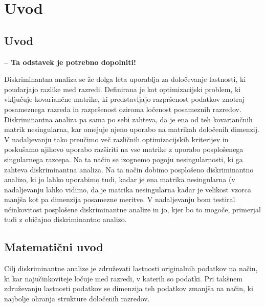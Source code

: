 \documentclass[mat1]{article}
\begin{document}
\section{Uvod}

\subsection{Uvod}

\textbf{-- Ta odstavek je potrebno dopolniti!}

Diskriminantna analiza se že dolga leta uporablja za določevanje lastnosti, ki poudarjajo razlike med razredi. Definirana je kot optimizacijski problem, ki vključuje kovariančne matrike, ki predstavljajo razpršenost podatkov znotraj posameznega razreda in razpršenost oziroma ločenost posameznih razredov. Diskriminantna analiza pa sama po sebi zahteva, da je ena od teh kovariančnih matrik nesingularna, kar omejuje njeno uporabo na matrikah določenih dimenzij. V nadaljevanju tako preučimo več različnih optimizacijskih kriterijev in poskušamo njihovo uporabo razširiti na vse matrike z uporabo posplošenega singularnega razcepa. Na ta način se izognemo pogoju nesingularnosti, ki ga zahteva diskriminantna analiza. Na ta način dobimo posplošeno diskriminantno analizo, ki jo lahko uporabimo tudi, kadar je ena matrika nesingularna (v nadaljevanju lahko vidimo, da je matrika nesingularna kadar je velikost vzorca manjša kot pa dimenzija posamezne meritve. V nadaljevanju bom testiral učinkovitost posplošene diskriminantne analize in jo, kjer bo to mogoče, primerjal tudi z običajno diskriminantno analizo.

\subsection{Matematični uvod}

Cilj diskriminantne analize je združevati lastnosti originalnih podatkov na način, ki kar najučinkoviteje ločuje med razredi, v katerih so podatki. Pri takšnem združevanju lastnosti podatkov se dimenzija teh podatkov zmanjša na način, ki najbolje ohranja strukture določenih razredov.  
\end{document}
